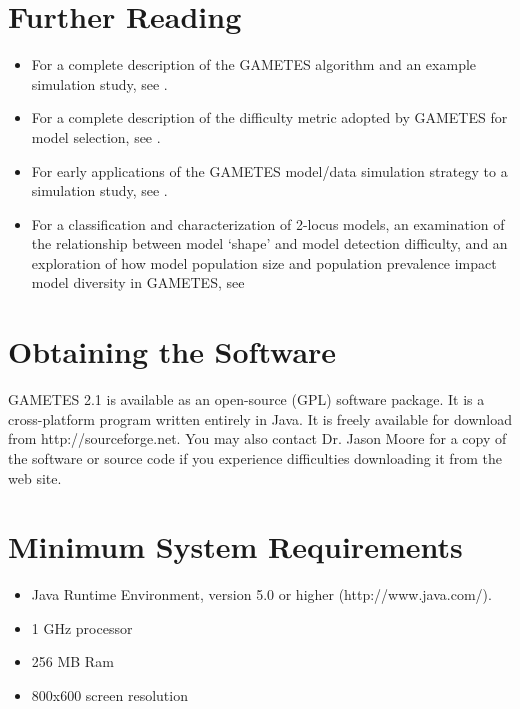 \documentclass{report}
\begin{document}
\section{Further Reading} 
\begin{itemize}
\item  For a complete description of the GAMETES algorithm and an example simulation study, see \cite{urbanowicz2012gametes}.
\item  For a complete description of the difficulty metric adopted by GAMETES for model selection, see \cite{urbanowicz2012predicting}.
\item  For early applications of the GAMETES model/data simulation strategy to a simulation study, see \cite{urbanowicz2010application,urbanowicz2011application}.
\item For a classification and characterization of 2-locus models, an examination of the relationship between model `shape' and model detection difficulty, and an exploration of how model population size and population prevalence impact model diversity in GAMETES, see \cite{urbanowicz2013classification}
\end{itemize}

\section{Obtaining the Software}
GAMETES 2.1 is available as an open-source (GPL) software package.  It is a cross-platform program written entirely in Java.  It is freely available for download from http://sourceforge.net.  You may also contact Dr. Jason Moore for a copy of the software or source code if you experience difficulties downloading it from the web site.

\section{Minimum System Requirements} 
\begin{itemize}
\item  Java Runtime Environment, version 5.0 or higher (http://www.java.com/).
\item  1 GHz processor
\item  256 MB Ram
\item  800x600 screen resolution
\end{itemize}
\end{document}
